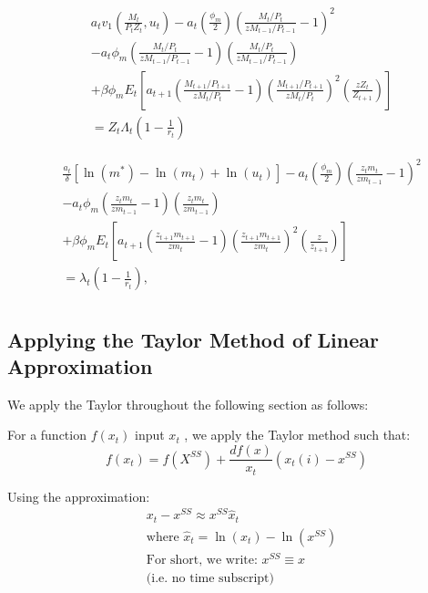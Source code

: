 \documentclass[11pt,preprint, authoryear]{elsarticle}
\numberwithin{equation}{section}
\numberwithin{figure}{section}
\numberwithin{table}{section}
\begin{document}
\[\begin{aligned}
&a_{t} v_{1}\left(\frac{M_{t}}{P_{t} Z_{t}}, u_{t}\right)-a_{t}\left(\frac{\phi_{m}}{2}\right)\left(\frac{M_{t} / P_{t}}{z M_{t-1} / P_{t-1}}-1\right)^{2} \\
&-a_{t} \phi_{m}\left(\frac{M_{t} / P_{t}}{z M_{t-1} / P_{t-1}}-1\right)\left(\frac{M_{t} / P_{t}}{z M_{t-1} / P_{t-1}}\right) \\
&+\beta \phi_{m} E_{t}\left[a_{t+1}\left(\frac{M_{t+1} / P_{t+1}}{z M_{t} / P_{t}}-1\right)\left(\frac{M_{t+1} / P_{t+1}}{z M_{t} / P_{t}}\right)^{2}\left(\frac{z Z_{t}}{Z_{t+1}}\right)\right] \\
&=Z_{t} \Lambda_{t}\left(1-\frac{1}{r_{t}}\right)
\end{aligned}\]

\[\begin{aligned} & \frac{a_{t}}{\delta}\left[\ln \left(m^{*}\right)-\ln \left(m_{t}\right)+\ln \left(u_{t}\right)\right]-a_{t}\left(\frac{\phi_{m}}{2}\right)\left(\frac{z_{t} m_{t}}{z m_{t-1}}-1\right)^{2} \\
& -a_{t} \phi_{m}\left(\frac{z_{t} m_{t}}{z m_{t-1}}-1\right)\left(\frac{z_{t} m_{t}}{z m_{t-1}}\right) \\
& +\beta \phi_{m} E_{t}\left[a_{t+1}\left(\frac{z_{t+1} m_{t+1}}{z m_{t}}-1\right)\left(\frac{z_{t+1} m_{t+1}}{z m_{t}}\right)^{2}\left(\frac{z}{z_{t+1}}\right)\right] \\
& =\lambda_{t}\left(1-\frac{1}{r_{t}}\right), \\
\end{aligned}\]

\hypertarget{applying-the-taylor-method-of-linear-approximation}{%
\subsection{Applying the Taylor Method of Linear
Approximation}\label{applying-the-taylor-method-of-linear-approximation}}

We apply the Taylor throughout the following section as follows:

For a function \(f(x_t)\) input \(x_t\) , we apply the Taylor method
such that: \[f(x_t) = f(X^{SS}) + \frac{df(x)}{x_t} (x_t(i) - x^{SS})\]

Using the approximation: \[\begin{aligned}
&x_t - x^{SS} \approx x^{SS} \hat{x}_{t}
\\
&\text{where } \hat{x}_{t} = \ln(x_t)-\ln(x^{SS})
\\
&\text{For short, we write: } x^{SS} \equiv x
\\
&\text{(i.e. no time subscript)}
\end{aligned}\]
\end{document}

